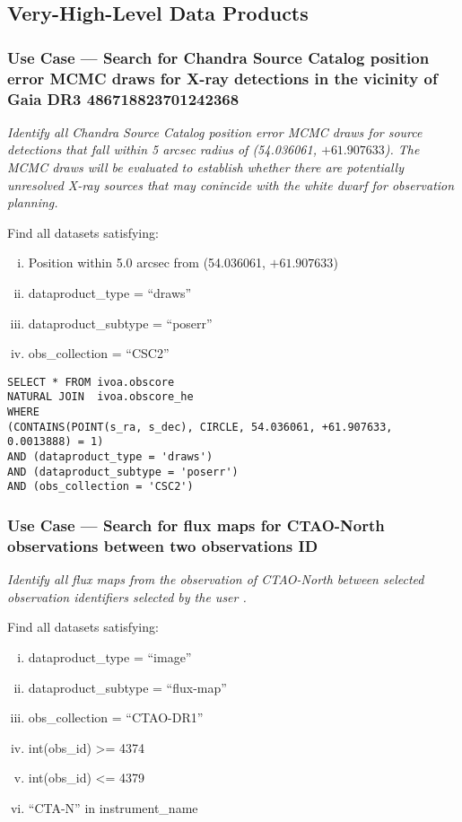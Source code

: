 \subsection{Very-High-Level Data Products}

\subsubsection{Use Case --- Search for Chandra Source Catalog position error MCMC draws for X-ray detections in the vicinity of Gaia DR3 486718823701242368}

{\em Identify all Chandra Source Catalog position error MCMC draws for source detections that fall within 5 arcsec radius of  (54.036061, $+61.907633$).  The MCMC draws will be evaluated to establish whether there are potentially unresolved X-ray sources that may conincide with the white dwarf for observation planning.\/}

\medskip
\noindent Find all datasets satisfying:
\begin{enumerate}[(i)]
  \item Position within 5.0 arcsec from (54.036061, $+61.907633$)
  \item dataproduct\_type = ``draws''
  \item dataproduct\_subtype = ``poserr''
  \item obs\_collection = ``CSC2''
\end{enumerate}

\begin{verbatim}
SELECT * FROM ivoa.obscore
NATURAL JOIN  ivoa.obscore_he 
WHERE
(CONTAINS(POINT(s_ra, s_dec), CIRCLE, 54.036061, +61.907633, 0.0013888) = 1) 
AND (dataproduct_type = 'draws')
AND (dataproduct_subtype = 'poserr')
AND (obs_collection = 'CSC2')
\end{verbatim}


\subsubsection{Use Case --- Search for flux maps for CTAO-North observations between two observations ID}

{\em Identify all flux maps from the observation of CTAO-North between selected observation identifiers selected by the user .\/}

\medskip
\noindent Find all datasets satisfying:
\begin{enumerate}[(i)]
  \item dataproduct\_type = ``image''
  \item dataproduct\_subtype = ``flux-map''
  \item obs\_collection = ``CTAO-DR1''
  \item int(obs\_id) >= 4374
  \item int(obs\_id) <= 4379
  \item ``CTA-N'' in instrument\_name
\end{enumerate}

